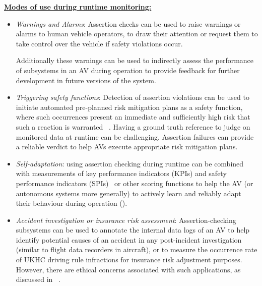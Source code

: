 \underline{\textbf{Modes of use during runtime monitoring:}}
	
	\begin{itemize}
		\item \emph{Warnings and Alarms}: Assertion checks can be used to raise warnings or alarms to human vehicle operators, to draw their attention or request them to take control over the vehicle if safety violations occur. 

		Additionally these warnings can be used to indirectly assess the performance of subsystems in an AV during operation to provide feedback for further development in future versions of the system.
		
		\item \emph{Triggering safety functions}: Detection of assertion violations can be used to initiate automated pre-planned risk mitigation plans as a safety function, where such occurrences present an immediate and sufficiently high risk that such a reaction is warranted ~\cite{RuntimeReview}. Having a ground truth reference to judge on monitored data at runtime can be challenging. Assertion failures can provide a reliable verdict to help AVs execute appropriate risk mitigation plans.
		
		\item \emph{Self-adaptation}: using assertion checking during runtime can be combined with measurements of key performance indicators (KPIs) and safety performance indicators (SPIs)~\cite{Koopman2020} or other scoring functions to help the AV (or autonomous systems more generally) to actively learn and reliably adapt their behaviour during operation (\cite{Kang2020}).
		
		\item \emph{Accident investigation or insurance risk assessment}: Assertion-checking subsystems can be used to annotate the internal data logs of an AV to help identify potential causes of an accident in any post-incident investigation (similar to flight data recorders in aircraft), or to measure the occurrence rate of UKHC driving rule infractions for insurance risk adjustment purposes. However, there are ethical concerns associated with such applications, as discussed in ~\cite{EthicalBlackBox}.
		
	\end{itemize}


